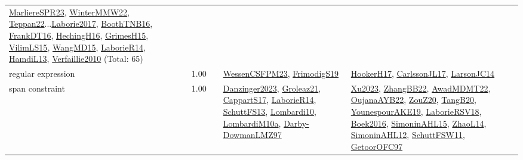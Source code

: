 {\begin{longtable}{p{3cm}r>{\raggedright\arraybackslash}p{6cm}>{\raggedright\arraybackslash}p{6cm}>{\raggedright\arraybackslash}p{8cm}}
\hyperref[detail:MarliereSPR23]{MarliereSPR23}, \hyperref[detail:WinterMMW22]{WinterMMW22}, \hyperref[detail:Teppan22]{Teppan22}...\hyperref[detail:Laborie2017]{Laborie2017}, \hyperref[detail:BoothTNB16]{BoothTNB16}, \hyperref[detail:FrankDT16]{FrankDT16}, \hyperref[detail:HechingH16]{HechingH16}, \hyperref[detail:GrimesH15]{GrimesH15}, \hyperref[detail:VilimLS15]{VilimLS15}, \hyperref[detail:WangMD15]{WangMD15}, \hyperref[detail:LaborieR14]{LaborieR14}, \hyperref[detail:HamdiL13]{HamdiL13}, \hyperref[detail:Verfaillie2010]{Verfaillie2010} (Total: 65)\\
\index{regular expression}\index{Constraints!regular expression}regular expression &  1.00 &  & \hyperref[detail:WessenCSFPM23]{WessenCSFPM23}, \hyperref[detail:FrimodigS19]{FrimodigS19} & \hyperref[detail:HookerH17]{HookerH17}, \hyperref[detail:CarlssonJL17]{CarlssonJL17}, \hyperref[detail:LarsonJC14]{LarsonJC14}\\
\index{span constraint}\index{Constraints!span constraint}span constraint &  1.00 &  & \hyperref[detail:Danzinger2023]{Danzinger2023}, \hyperref[detail:Groleaz21]{Groleaz21}, \hyperref[detail:CappartS17]{CappartS17}, \hyperref[detail:LaborieR14]{LaborieR14}, \hyperref[detail:SchuttFS13]{SchuttFS13}, \hyperref[detail:Lombardi10]{Lombardi10}, \hyperref[detail:LombardiM10a]{LombardiM10a}, \hyperref[detail:Darby-DowmanLMZ97]{Darby-DowmanLMZ97} & \hyperref[detail:Xu2023]{Xu2023}, \hyperref[detail:ZhangBB22]{ZhangBB22}, \hyperref[detail:AwadMDMT22]{AwadMDMT22}, \hyperref[detail:OujanaAYB22]{OujanaAYB22}, \hyperref[detail:ZouZ20]{ZouZ20}, \hyperref[detail:TangB20]{TangB20}, \hyperref[detail:YounespourAKE19]{YounespourAKE19}, \hyperref[detail:LaborieRSV18]{LaborieRSV18}, \hyperref[detail:Boek2016]{Boek2016}, \hyperref[detail:SimoninAHL15]{SimoninAHL15}, \hyperref[detail:ZhaoL14]{ZhaoL14}, \hyperref[detail:SimoninAHL12]{SimoninAHL12}, \hyperref[detail:SchuttFSW11]{SchuttFSW11}, \hyperref[detail:GetoorOFC97]{GetoorOFC97}\\

\end{longtable}}
